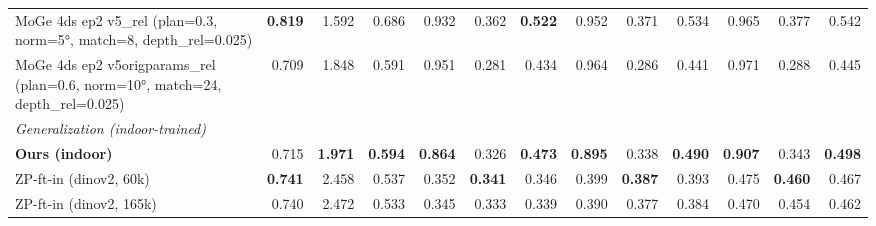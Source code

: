 \documentclass[10pt]{article}
\begin{document}
\begin{table}[t]
{\begin{tabular}{l r r r r r r r r r r r r}
MoGe 4ds ep2 v5\_rel (plan=0.3, norm=5°, match=8, depth\_rel=0.025) & \textbf{0.819} & 1.592 & 0.686 & 0.932 & 0.362 & \textbf{0.522} & 0.952 & 0.371 & 0.534 & 0.965 & 0.377 & 0.542 \\
MoGe 4ds ep2 v5origparams\_rel (plan=0.6, norm=10°, match=24, depth\_rel=0.025) & 0.709 & 1.848 & 0.591 & 0.951 & 0.281 & 0.434 & 0.964 & 0.286 & 0.441 & 0.971 & 0.288 & 0.445 \\
\midrule
\multicolumn{13}{l}{\textit{Generalization (indoor-trained)}} \\
\textbf{Ours (indoor)} & 0.715 & \textbf{1.971} & \textbf{0.594} & \textbf{0.864} & 0.326 & \textbf{0.473} & \textbf{0.895} & 0.338 & \textbf{0.490} & \textbf{0.907} & 0.343 & \textbf{0.498} \\
ZP-ft-in (dinov2, 60k) & \textbf{0.741} & 2.458 & 0.537 & 0.352 & \textbf{0.341} & 0.346 & 0.399 & \textbf{0.387} & 0.393 & 0.475 & \textbf{0.460} & 0.467 \\
ZP-ft-in (dinov2, 165k) & 0.740 & 2.472 & 0.533 & 0.345 & 0.333 & 0.339 & 0.390 & 0.377 & 0.384 & 0.470 & 0.454 & 0.462 \\
\bottomrule
\end{tabular}%
}
\end{table}

\clearpage
\end{document}
